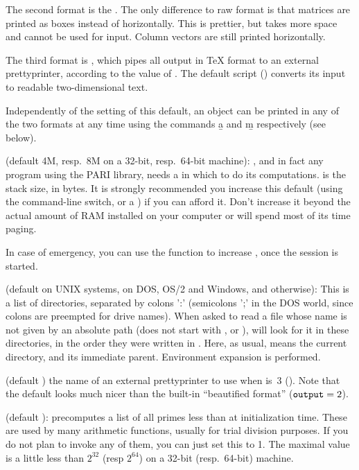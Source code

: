 The second format is the . The only difference to
raw format is that matrices are printed as boxes instead of horizontally.
This is prettier, but takes more space and cannot be used for input. Column
vectors are still printed horizontally.

The third format is , which pipes
all  output in TeX format to an external prettyprinter, according to the
value of . The default script () converts
its input to readable two-dimensional text.

Independently of the setting of this default, an object can be printed
in any of the two formats at any time using the commands \b{a} and \b{m}
respectively (see below).

\label{se:parisize} (default 4M, resp.~8M on a 32-bit,
resp.~64-bit machine): , and in fact any program using the PARI
library, needs a  in which to do its computations. 
is the stack size, in bytes. It is strongly recommended you increase this
default (using the  command-line switch, or a ) if you can
afford it. Don't increase it beyond the actual amount of RAM installed on
your computer or  will spend most of its time paging.

In case of emergency, you can use the  function to
increase , once the session is started.

 (default  on UNIX systems,
 on DOS, OS/2 and Windows, and  otherwise):
This is a list of directories, separated by colons ':' (semicolons ';' in the
DOS world, since colons are preempted for drive names). When asked to read a
file whose name is not given by an absolute path (does not start with
\kbd{/},  or ),  will look for it in these
directories, in the order they were written in . Here, as usual,
 means the current directory, and  its immediate parent.
Environment expansion is performed.

 (default ) the name of an external prettyprinter to use when
 is~3 (). Note that the default
 looks much nicer than the built-in ``beautified
format'' (${\tt output} = 2$).

 (default ):  precomputes a list of
all primes less than  at initialization time. These are used
by many arithmetic functions, usually for trial division purposes. If you do
not plan to invoke any of them, you can just set this to 1. The maximal value
is a little less than $2^{32}$ (resp $2^{64}$) on a 32-bit (resp.~64-bit)
machine.

